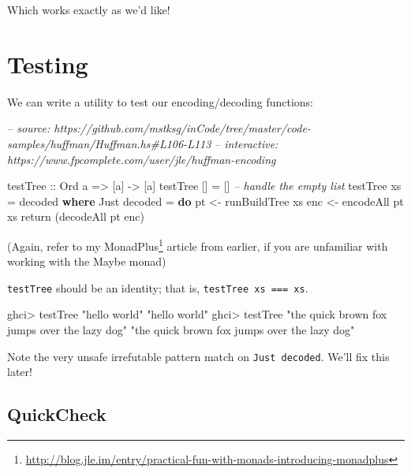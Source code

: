 \documentclass[]{article}
\newenvironment{Shaded}{}{}
\newcommand{\CommentTok}[1]{\textcolor[rgb]{0.38,0.63,0.69}{\textit{#1}}}
\newcommand{\DataTypeTok}[1]{\textcolor[rgb]{0.56,0.13,0.00}{#1}}
\newcommand{\FunctionTok}[1]{\textcolor[rgb]{0.02,0.16,0.49}{#1}}
\newcommand{\KeywordTok}[1]{\textcolor[rgb]{0.00,0.44,0.13}{\textbf{#1}}}
\newcommand{\NormalTok}[1]{#1}
\newcommand{\OtherTok}[1]{\textcolor[rgb]{0.00,0.44,0.13}{#1}}
\newcommand{\StringTok}[1]{\textcolor[rgb]{0.25,0.44,0.63}{#1}}
\renewcommand{\href}[2]{#2\footnote{\url{#1}}}
\begin{document}
Which works exactly as we'd like!

\hypertarget{testing}{%
\section{Testing}\label{testing}}

We can write a utility to test our encoding/decoding functions:

\begin{Shaded}
\begin{Highlighting}[]
\CommentTok{-- source: https://github.com/mstksg/inCode/tree/master/code-samples/huffman/Huffman.hs#L106-L113}
\CommentTok{-- interactive: https://www.fpcomplete.com/user/jle/huffman-encoding}

\OtherTok{testTree ::} \DataTypeTok{Ord}\NormalTok{ a }\OtherTok{=>}\NormalTok{ [a] }\OtherTok{->}\NormalTok{ [a]}
\NormalTok{testTree [] }\FunctionTok{=}\NormalTok{ []                    }\CommentTok{-- handle the empty list}
\NormalTok{testTree xs }\FunctionTok{=}\NormalTok{ decoded}
  \KeywordTok{where}
    \DataTypeTok{Just}\NormalTok{ decoded }\FunctionTok{=} \KeywordTok{do}
\NormalTok{      pt  }\OtherTok{<-}\NormalTok{ runBuildTree xs}
\NormalTok{      enc }\OtherTok{<-}\NormalTok{ encodeAll pt xs}
\NormalTok{      return (decodeAll pt enc)}
\end{Highlighting}
\end{Shaded}

(Again, refer to my
\href{http://blog.jle.im/entry/practical-fun-with-monads-introducing-monadplus}{MonadPlus}
article from earlier, if you are unfamiliar with working with the Maybe monad)

\texttt{testTree} should be an identity; that is,
\texttt{testTree\ xs\ ===\ xs}.

\begin{Shaded}
\begin{Highlighting}[]
\NormalTok{ghci}\FunctionTok{>}\NormalTok{ testTree }\StringTok{"hello world"}
\StringTok{"hello world"}
\NormalTok{ghci}\FunctionTok{>}\NormalTok{ testTree }\StringTok{"the quick brown fox jumps over the lazy dog"}
\StringTok{"the quick brown fox jumps over the lazy dog"}
\end{Highlighting}
\end{Shaded}

Note the very unsafe irrefutable pattern match on \texttt{Just\ decoded}. We'll
fix this later!

\hypertarget{quickcheck}{%
\subsection{QuickCheck}\label{quickcheck}}
\end{document}
